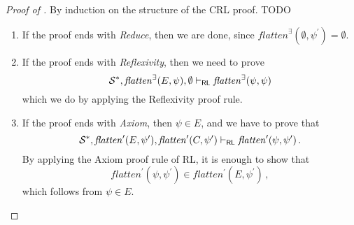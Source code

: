 \begin{proof}[Proof of ]
By induction on the structure of the CRL proof. TODO
\begin{enumerate}
    \item If the proof ends with \emph{Reduce}, then we are done, since $\mathit{flatten}^\exists(\emptyset, \psi^\prime) = \emptyset$.
    
    \item If the proof ends with \emph{Reflexivity}, then we need to prove
    \begin{equation*}
        \mathcal{S}^*, \mathit{flatten}^\exists(E, \psi), \emptyset \vdash_{\mathsf{RL}}
          \mathit{flatten}^\exists(\psi, \psi) 
    \end{equation*}
    which we do by applying the Reflexivity proof rule.
    
    \item If the proof ends with \emph{Axiom}, then $\psi \in E$,
          and we have to prove that
          \begin{equation*}
            \mathcal{S}^*, \mathit{flatten}^\prime(E, \psi^\prime), \mathit{flatten}^\prime(C, \psi^\prime) \vdash_{\mathsf{RL}}
            \mathit{flatten}^\prime(\psi, \psi^\prime)               \, .
          \end{equation*}
          By applying the Axiom proof rule of RL, it is enough to show that
          \begin{equation*}
              \mathit{flatten}^\prime(\psi, \psi^\prime) \in \mathit{flatten^\prime}(E, \psi^\prime) \, ,
          \end{equation*}
          which follows from $\psi \in E$.
          

\end{enumerate}
\end{proof}
